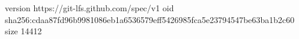 version https://git-lfs.github.com/spec/v1
oid sha256:cdaa87fd96b9981086eb1a6536579eff5426985fca5e23794547be63ba1b2c60
size 14412
